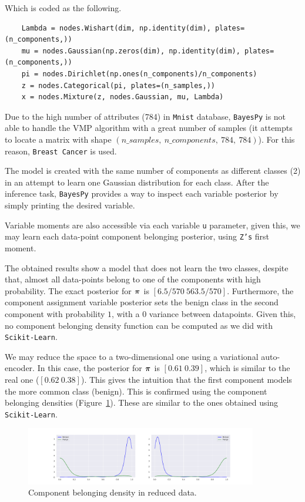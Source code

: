 Which is coded as the following.
\begin{verbatim}
    Lambda = nodes.Wishart(dim, np.identity(dim), plates=(n_components,))
    mu = nodes.Gaussian(np.zeros(dim), np.identity(dim), plates=(n_components,))
    pi = nodes.Dirichlet(np.ones(n_components)/n_components)
    z = nodes.Categorical(pi, plates=(n_samples,))
    x = nodes.Mixture(z, nodes.Gaussian, mu, Lambda)
\end{verbatim}

Due to the high number of attributes (784) in \texttt{Mnist} database, \texttt{BayesPy} is not able to handle the VMP algorithm with a great number of samples (it attempts to locate a matrix with shape \((n\_samples,\ n\_components,\ 784,\ 784)\)). For this reason, \texttt{Breast Cancer} is used.

The model is created with the same number of components as different classes (2) in an attempt to learn one Gaussian distribution for each class. After the inference task, \texttt{BayesPy} provides a way to inspect each variable posterior by simply printing the desired variable.

Variable moments are also accessible via each variable \texttt{u} parameter, given this, we may learn each data-point component belonging posterior, using \texttt{Z's} first moment.

The obtained results show a model that does not learn the two classes, despite that, almost all data-points belong to one of the components with high probability. The exact posterior for \(\bm{\pi}\) is \([6.5/570\  563.5/570]\). Furthermore, the component assignment variable posterior sets the benign class in the second component with probability \(1\), with a \(0\) variance between datapoints. Given this, no component belonging density function can be computed as we did with \texttt{Scikit-Learn}.

We may reduce the space to a two-dimensional one using a variational auto-encoder. In this case, the posterior for \(\bm{\pi}\) is \([0.61\ 0.39]\), which is similar to the real one (\([0.62\ 0.38]\)). This gives the intuition that the first component models the more common class (benign). This is confirmed using the component belonging densities (Figure~\ref{fig:proba_reduced_bayes}). These are similar to the ones obtained using \texttt{Scikit-Learn}.
 
\begin{figure}[h!]
  \centering
  \includegraphics[width=0.9\textwidth]{tex/images/proba_reduced_bayes.pdf}
  \caption{Component belonging density in reduced data.}\label{fig:proba_reduced_bayes}
\end{figure}


